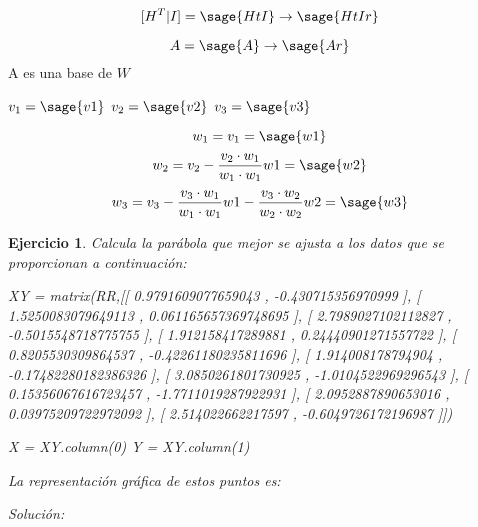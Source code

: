 \documentclass{amsart}
\newtheorem{ejer}{Ejercicio}
\begin{document}
$$
	[H^T|I] = \sage{HtI} \to \sage{HtIr}
$$

$$
	A = \sage{A} \to \sage{Ar}
$$
A es una base de $W$


$v_1 = \sage{v1}$ $v_2 = \sage{v2}$ $v_3 = \sage{v3}$

$$w_1 = v_1 = \sage{w1}$$
$$w_2 = v_2 - \frac{v_2 \cdot w_1}{w_1 \cdot w_1} w1 = \sage{w2}$$
$$w_3 = v_3 - \frac{v_3 \cdot w_1}{w_1 \cdot w_1} w1 - \frac{v_3 \cdot w_2}{w_2 \cdot w_2} w2 = \sage{w3}$$



\begin{ejer} 
Calcula la parábola que mejor se ajusta a los datos que se proporcionan a continuación:
\begin{sageblock}
XY = matrix(RR,[[ 0.9791609077659043 ,  -0.430715356970999 ],
                [ 1.5250083079649113 ,  0.061165657369748695 ],
                [ 2.7989027102112827 ,  -0.5015548718775755 ],
                [ 1.912158417289881 ,  0.24440901271557722 ],
                [ 0.8205530309864537 ,  -0.42261180235811696 ],
                [ 1.914008178794904 ,  -0.17482280182386326 ],
                [ 3.0850261801730925 ,  -1.0104522969296543 ],
                [ 0.15356067616723457 ,  -1.7711019287922931 ],
                [ 2.0952887890653016 ,  0.03975209722972092 ],
                [ 2.514022662217597 ,  -0.6049726172196987 ]])

X = XY.column(0)
Y = XY.column(1)
\end{sageblock}

La representación gráfica de estos puntos es:

\begin{sagesub}
\begin{center}
\end{center}
\end{sagesub}


\end{ejer} 

{\it Solución:}


\end{document}
